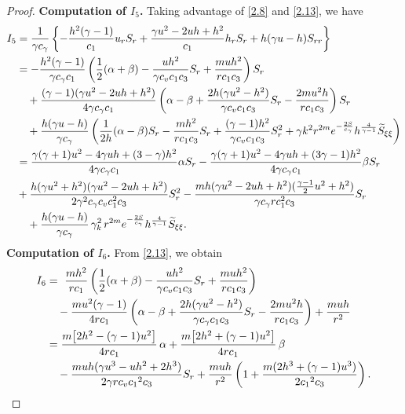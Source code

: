 \documentclass[11pt,reqno]{article}
\numberwithin{equation}{section}
\begin{document}
\begin{proof}
\noindent\textbf{Computation of $I_5$.}
Taking advantage of \eqref{2.8} and \eqref{2.13}, we have
\begin{align}
I_5
&=\frac{1}{\gamma c_\gamma}\left\{-\frac{h^2(\gamma-1)}{c_1}u_rS_r+\frac{\gamma u^2-2uh+h^2}{c_1}h_rS_r+h(\gamma u-h)S_{rr}\right\}\nonumber\\
&= -\frac{h^2(\gamma-1)}{\gamma c_\gamma c_1} \left( \frac{1}{2}(\alpha + \beta) - \frac{uh^2}{\gamma c_v c_1 c_3} S_r + \frac{muh^2}{r c_1 c_3} \right) S_r \nonumber\\
&\quad + \frac{(\gamma-1)(\gamma u^2 - 2uh + h^2)}{4\gamma c_\gamma c_1} \left( \alpha - \beta + \frac{2h(\gamma u^2 - h^2)}{\gamma c_v c_1 c_3} S_r - \frac{2mu^2 h}{r c_1 c_3} \right) S_r \nonumber\\
&\quad + \frac{h(\gamma u - h)}{\gamma c_\gamma} \left( \frac{1}{2h}(\alpha - \beta) S_r - \frac{mh^2}{r c_1 c_3} S_r + \frac{(\gamma-1)h^2}{\gamma c_v c_1 c_3} S_r^2 + \gamma k^2 r^{2m} e^{-\frac{2S}{c_\gamma}} h^{\frac{4}{\gamma-1}} \widetilde{S}_{\xi\xi} \right)\nonumber\\
&=  \frac{\gamma(\gamma+1)u^2-4\gamma uh+(3-\gamma)h^2}{4\gamma c_\gamma c_1}\alpha S_r
- \frac{\gamma(\gamma+1)u^2-4\gamma uh+(3\gamma-1)h^2}{4\gamma c_\gamma c_1}\beta  S_r \nonumber\\
& + \frac{h(\gamma u^2+h^2)(\gamma u^2-2uh+h^2)}{2\gamma^2 c_\gamma c_v c_1^2c_3} S_r^2 - \frac{mh(\gamma u^2-2uh+h^2)(\frac{\gamma-1}{2}u^2+h^2)}{\gamma c_\gamma rc_1^2c_3} S_r \nonumber\\
&\quad+ \frac{h(\gamma u - h)}{\gamma c_\gamma} \, \gamma_k^2 \, r^{2m} e^{-\frac{2S}{c_\gamma}} h^{\frac{4}{\gamma-1}} \widetilde{S}_{\xi\xi}. \notag
   \end{align}
\noindent\textbf{Computation of $I_6$.}
From \eqref{2.13}, we obtain
\begin{align}
 I_6
  &=\ \frac{m h^2}{rc_1}\left( \frac12(\alpha+\beta) - \frac{uh^2}{\gamma c_v c_1 c_3}S_r + \frac{m u h^2}{rc_1 c_3} \right) \nonumber\\
  &\quad-\frac{m u^2(\gamma-1)}{4rc_1}\left( \alpha-\beta + \frac{2h(\gamma u^2-h^2)}{\gamma c_\gamma c_1 c_3}S_r - \frac{2m u^2 h}{rc_1 c_3} \right) +\frac{m u h}{r^2}\nonumber\\
  &= \frac{m\big[2h^2 - (\gamma-1)u^2\big]}{4r c_1} \,\alpha + \frac{m\big[2h^2 + (\gamma-1)u^2\big]}{4r c_1} \,\beta \nonumber\\
  &\quad - \frac{muh(\gamma u^3-uh^2+2h^3)}{2\gamma r c_v{c_1}^2 c_3}  S_r + \frac{m u h}{r^2}\left( 1 + \frac{m(2h^3 + (\gamma-1)u^3)}{2 {c_1}^2 c_3}  \right). \notag
\end{align}


\end{proof}
\end{document}
